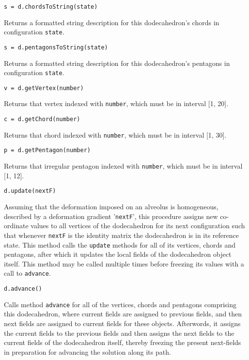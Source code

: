 \medskip\noindent
\texttt{s = d.chordsToString(state)}

\medskip\noindent
Returns a formatted string description for this dodecahedron's chords in configuration \texttt{state}.

\medskip\noindent
\texttt{s = d.pentagonsToString(state)}

\medskip\noindent
Returns a formatted string description for this dodecahedron's pentagons in configuration \texttt{state}.

\medskip\noindent
\texttt{v = d.getVertex(number)}

\medskip\noindent
Returns that vertex indexed with \texttt{number}, which must be in interval [1, 20].

\medskip\noindent
\texttt{c = d.getChord(number)}

\medskip\noindent
Returns that chord indexed with \texttt{number}, which must be in interval [1, 30].

\medskip\noindent
\texttt{p = d.getPentagon(number)}

\medskip\noindent
Returns that irregular pentagon indexed with \texttt{number}, which must be in interval [1, 12].

\newpage
\medskip\noindent
\texttt{d.update(nextF)}

\medskip\noindent
Assuming that the deformation imposed on an alveolus is homogeneous, described by a deformation gradient '\texttt{nextF}', this procedure assigns new co-ordinate values to all vertices of the dodecahedron for its next configuration such that whenever \texttt{nextF} is the identity matrix the dodecahedron is in its reference state.  This method calls the \texttt{update} methods for all of its vertices, chords and pentagons, after which it updates the local fields of the dodecahedron object itself.  This method may be called multiple times before freezing its values with a call to \texttt{advance}.

\medskip\noindent
\texttt{d.advance()}

\medskip\noindent
Calls method \texttt{advance} for all of the vertices, chords and pentagons comprising this dodecahedron, where current fields are assigned to previous fields, and then next fields are assigned to current fields for these objects.  Afterwords, it assigns the current fields to the previous fields and then assigns the next fields to the current fields of the dodecahedron itself, thereby freezing the present next-fields in preparation for advancing the solution along its path.

